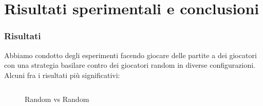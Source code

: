 \documentclass{beamer}
\begin{document}
\section{Risultati sperimentali e conclusioni}
\begin{frame}
   \frametitle{Risultati}
   Abbiamo condotto degli esperimenti facendo giocare delle partite a dei giocatori con una strategia basilare contro dei giocatori random in diverse configurazioni.
   Alcuni fra i risultati più significativi:
   
   
\def\angle{0}
\def\radius{3}
\def\cyclelist{{"blue","red","green"}}
\newcount\cyclecount {}
\newcount\ind {}


\begin{columns}
   \vfill
   
\begin{figure}
   \tiny
   \centering
{}
\vfill
\vspace*{2.2em}
\caption{Random vs Random}
\end{figure}

\begin{figure}


\end{figure}
\end{columns}
\end{frame}
\end{document}
